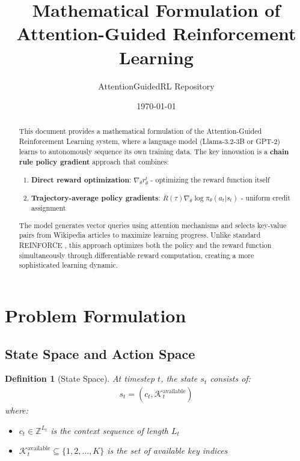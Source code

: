 \documentclass[11pt]{article}
\title{Mathematical Formulation of Attention-Guided Reinforcement Learning}
\author{AttentionGuidedRL Repository}
\date{\today}
\newtheorem{definition}{Definition}
\begin{document}
\maketitle

\begin{abstract}
This document provides a mathematical formulation of the Attention-Guided Reinforcement Learning system, where a language model (Llama-3.2-3B or GPT-2) learns to autonomously sequence its own training data. The key innovation is a \textbf{chain rule policy gradient} approach that combines:

\begin{enumerate}
    \item \textbf{Direct reward optimization}: $\nabla_\theta r_\theta^t$ - optimizing the reward function itself
    \item \textbf{Trajectory-average policy gradients}: $\bar{R}(\tau) \nabla_\theta \log \pi_\theta(a_t | s_t)$ - uniform credit assignment
\end{enumerate}

The model generates vector queries using attention mechanisms and selects key-value pairs from Wikipedia articles to maximize learning progress. Unlike standard REINFORCE \cite{williams1992simple}, this approach optimizes both the policy and the reward function simultaneously through differentiable reward computation, creating a more sophisticated learning dynamic.
\end{abstract}

\tableofcontents

\section{Problem Formulation}

\subsection{State Space and Action Space}

\begin{definition}[State Space]
At timestep $t$, the state $s_t$ consists of:
\begin{align}
s_t = (c_t, \mathcal{K}_t^{\text{available}})
\end{align}
where:
\begin{itemize}
    \item $c_t \in \mathbb{Z}^{L_t}$ is the context sequence of length $L_t$
    \item $\mathcal{K}_t^{\text{available}} \subseteq \{1, 2, \ldots, K\}$ is the set of available key indices
\end{itemize}
\end{definition}
\end{document}
